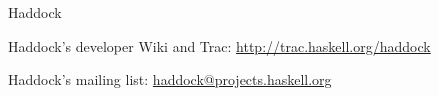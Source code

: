 \begin{hcarentry}{Haddock}
\begin{compactitem}
\item Haddock's developer Wiki and Trac:
\url{http://trac.haskell.org/haddock}

\item Haddock's mailing list:
\url{haddock@projects.haskell.org}
\end{compactitem}
\end{hcarentry}
